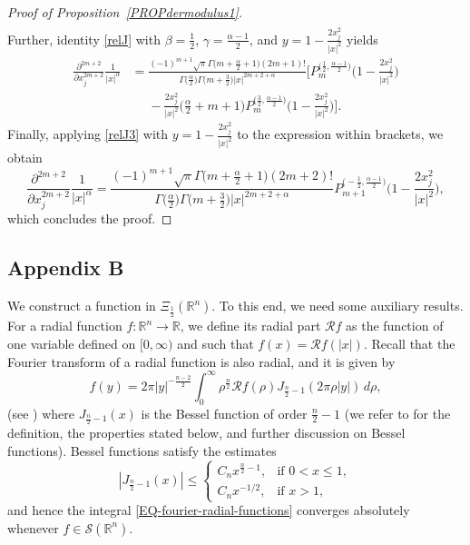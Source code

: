 \documentclass[reqno,11pt]{amsart}
\theoremstyle{definition}
\def\R{\mathbb{R}}
\begin{document}
\begin{proof}[Proof of Proposition~\ref{PROPdermodulus1}]
\begin{align*}
	\end{align*}	
	Further, identity \eqref{relJ} with $\beta= \frac{1}{2}$, $\gamma= \frac{\alpha-1}{2}$, and $y=1-\frac{2x_j^2}{|x|^2}$ yields
	\begin{align*}
		\nonumber
		\frac{\partial^{2m+2}}{\partial x_j^{2m+2}} \frac{1}{|x|^\alpha}&=\frac{(-1)^{m+1} \sqrt{\pi} \Gamma \big(m+\frac{\alpha}{2}+1\big) (2m+1)!}{\Gamma \big(\frac{\alpha}{2}\big) \Gamma \big(m+\frac{3}{2}\big) |x|^{2m+2+\alpha}} \bigg[P_m^{\big(\frac{1}{2}, \frac{\alpha-1}{2}\big)}\bigg(1-\frac{2x_j^2}{|x|^2}\bigg) \nonumber \\
		&\phantom{=}-\frac{2x_j^2}{|x|^2}\Big(\frac{\alpha}{2}+m+1\Big) P_m^{\big(\frac{3}{2}, \frac{\alpha-1}{2}\big)}\bigg(1-\frac{2x_j^2}{|x|^2}\bigg)\bigg].	
	\end{align*}
	Finally, applying \eqref{relJ3} with $y=1-\frac{2x_j^2}{|x|^2}$ to the expression within brackets, we obtain
	\[
	\frac{\partial^{2m+2}}{\partial x_j^{2m+2}} \frac{1}{|x|^\alpha}=\frac{(-1)^{m+1} \sqrt{\pi} \Gamma \big(m+\frac{\alpha}{2}+1\big) (2m+2)!}{\Gamma \big(\frac{\alpha}{2}\big) \Gamma \big(m+\frac{3}{2}\big) |x|^{2m+2+\alpha}}P_{m+1}^{\big(-\frac{1}{2}, \frac{\alpha-1}{2}\big)}\bigg(1-\frac{2x_j^2}{|x|^2}\bigg),
	\]
	which concludes the proof.
\end{proof}


\subsection{Appendix B}
We construct  a function in $\Xi_\frac{1}{2}(\R^n)$. To this end, we need some auxiliary results.
	For a radial function $f:\R^n\to \R$, we define its radial part $\mathcal{R}f$ as the function of one variable defined on $[0,\infty)$ and such that $f(x) = \mathcal{R}f(|x|)$. Recall that the Fourier transform of a radial function is also radial, and it is given by
\begin{equation}
	\label{EQ-fourier-radial-functions}
	\widehat{f}(y)=2\pi |y|^{-\frac{n-2}{2}} \int_{0}^\infty \rho^\frac{n}{2}\mathcal{R}f(\rho)J_{\frac{n}{2}-1}(2\pi \rho|y|)\,  d\rho,
\end{equation}
(see \cite[Ch. IV]{SWfourier}) where $J_{\frac{n}{2}-1}(x)$ is the Bessel function of order $\frac{n}{2}-1$ (we refer to \cite[Ch. VII]{EMOT} for the definition, the properties stated below, and further discussion on Bessel functions). Bessel functions satisfy the estimates
\begin{equation*}
	|J_{\frac{n}{2}-1}(x)|\leq \begin{cases}
		C_n x^{\frac{n}{2}-1},&\text{if }0<x\leq 1,\\
		C_n x^{-1/2}, &\text{if }x>1,
	\end{cases}
\end{equation*}
and hence the integral \eqref{EQ-fourier-radial-functions} converges absolutely whenever $f\in \mathcal{S}(\R^n)$.
\end{document}
